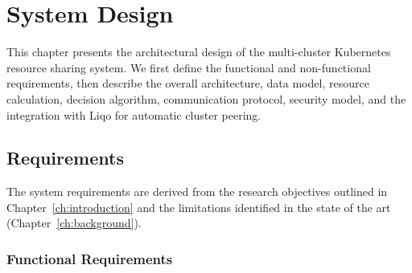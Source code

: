 
\chapter{System Design}
\label{ch:design}

This chapter presents the architectural design of the multi-cluster Kubernetes resource sharing system. We first define the functional and non-functional requirements, then describe the overall architecture, data model, resource calculation, decision algorithm, communication protocol, security model, and the integration with Liqo for automatic cluster peering.


\section{Requirements}
\label{sec:requirements}

The system requirements are derived from the research objectives outlined in Chapter~\ref{ch:introduction} and the limitations identified in the state of the art (Chapter~\ref{ch:background}).

\subsection{Functional Requirements}
\label{subsec:functional-req}

